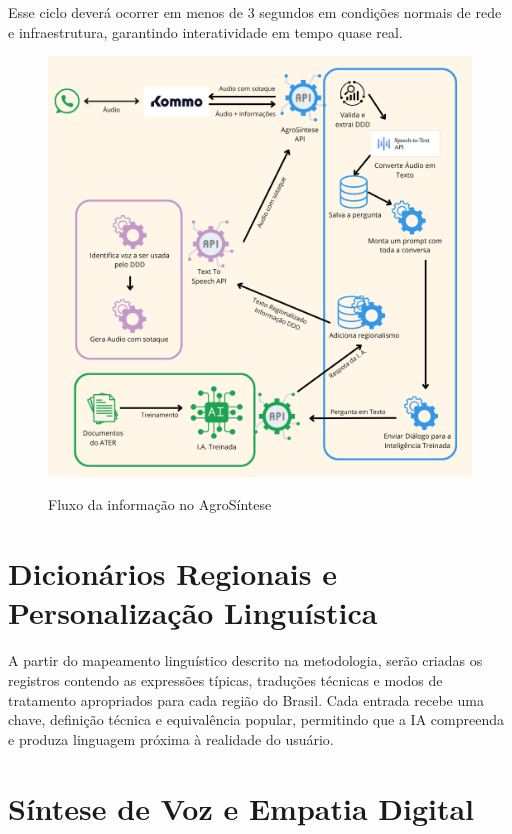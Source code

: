 Esse ciclo deverá ocorrer em menos de 3 segundos em condições normais de rede e infraestrutura, garantindo interatividade em tempo quase real.

\begin{figure}[h]
	\centering
	\caption{Fluxo da informação no AgroSíntese }
	\includegraphics[width=1.0\linewidth,scale=1.0]{images/agro-sintese-arquitetura-03.png}
	\label{fig:whatsappfluxo}
\end{figure}


\section{Dicionários Regionais e Personalização Linguística}

A partir do mapeamento linguístico descrito na metodologia, serão criadas os registros contendo as expressões típicas, traduções técnicas e modos de tratamento apropriados para cada região do Brasil. Cada entrada recebe uma chave, definição técnica e equivalência popular, permitindo que a IA compreenda e produza linguagem próxima à realidade do usuário.

\section{Síntese de Voz e Empatia Digital}

